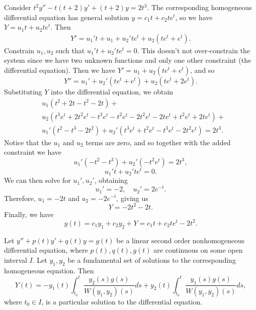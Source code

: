 \begin{exmp}
    Consider $t^2y'' - t(t+2)y' + (t+2)y = 2t^3$. The corresponding homogeneous differential equation has general solution $y = c_1t + c_2te^t$, so we have $Y = u_1t + u_2te^t$. Then
    \begin{align*}
        Y' = u_1't + u_1 + u_2'te^t + u_2(te^t + e^t).
    \end{align*}
    Constrain $u_1, u_2$ such that $u_1't + u_2'te^t = 0$. This doesn't not over-constrain the system since we have two unknown functions and only one other constraint (the differential equation). Then we have $Y' = u_1 + u_2(te^t + e^t)$, and so
    \[Y'' = u_1' + u_2'(te^t + e^t) + u_2(te^t + 2e^t).\]
    Substituting $Y$ into the differential equation, we obtain
    \begin{align*}
        &u_1(t^2 + 2t - t^2 - 2t) + \\
        &u_2(t^3e^t + 2t^2e^t - t^3e^t - t^2e^t - 2t^2e^t - 2te^t + t^2e^t + 2te^t) + \\
        &u_1'(t^2 - t^3 - 2t^2) + u_2'(t^3e^t + t^2e^t - t^3e^t - 2t^2e^t) = 2t^3.
    \end{align*}
    Notice that the $u_1$ and $u_2$ terms are zero, and so together with the added constraint we have
    \[u_1'(-t^2 - t^3) + u_2'(-t^2e^t) = 2t^3,\]
    \[u_1't + u_2'te^t = 0.\]
    We can then solve for $u_1', u_2'$, obtaining
    \[u_1' = -2, \quad u_2' = 2e^{-t}.\]
    Therefore, $u_1 = -2t$ and $u_2 = -2e^{-t}$, giving us
    \[Y = -2t^2 - 2t.\] Finally, we have
    \[y(t) = c_1y_1 + c_2y_2 + Y = c_1t + c_2te^t - 2t^2.\]
\end{exmp}

\begin{thm}
    Let $y'' + p(t)y' + q(t)y = g(t)$ be a linear second order nonhomogeneous differential equation, where $p(t), q(t), g(t)$ are continuous on some open interval $I$. Let $y_1, y_2$ be a fundamental set of solutions to the corresponding homogeneous equation. Then
    \[Y(t) = -y_1(t)\int_{t_0}^t\frac{y_2(s)g(s)}{W(y_1,y_2)(s)}ds + y_2(t)\int_{t_0}^t\frac{y_1(s)g(s)}{W(y_1,y_2)(s)}ds,\] where $t_0 \in I$, is a particular solution to the differential equation.
\end{thm}

